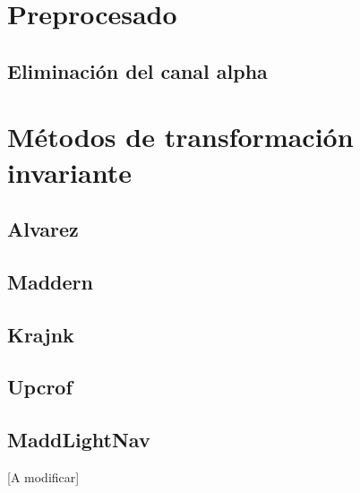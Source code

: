 

\section{Preprocesado}\label{preprocesado}


\subsection{Eliminación del canal alpha}\label{eliminación-del-canal-alpha}


\section{Métodos de transformación invariante}\label{metodos-de-transformación-invariante}


\subsection{Alvarez}\label{alvarez}
\cite{alvarez2011}

\subsection{Maddern}\label{maddern}
\cite{maddern2014}

\subsection{Krajnk}\label{krajnk}
\cite{krajník2015}

\subsection{Upcrof}\label{upcrof}
\cite{upcroft2014}

\subsection{MaddLightNav}\label{madd-light-nav}
[A modificar]

